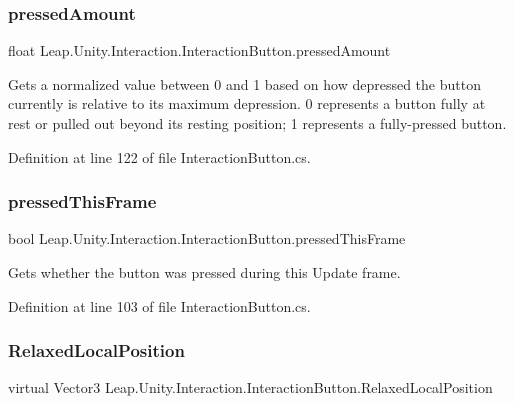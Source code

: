 \subsubsection{\texorpdfstring{pressedAmount}{pressedAmount}}
{\footnotesize\ttfamily float Leap.\+Unity.\+Interaction.\+Interaction\+Button.\+pressed\+Amount\hspace{0.3cm}{\ttfamily [get]}}



Gets a normalized value between 0 and 1 based on how depressed the button currently is relative to its maximum depression. 0 represents a button fully at rest or pulled out beyond its resting position; 1 represents a fully-\/pressed button. 



Definition at line 122 of file Interaction\+Button.\+cs.

\mbox{\label{class_leap_1_1_unity_1_1_interaction_1_1_interaction_button_ad9f5e7c4373f864d20166bbc438f957a}} 
\subsubsection{\texorpdfstring{pressedThisFrame}{pressedThisFrame}}
{\footnotesize\ttfamily bool Leap.\+Unity.\+Interaction.\+Interaction\+Button.\+pressed\+This\+Frame\hspace{0.3cm}{\ttfamily [get]}}



Gets whether the button was pressed during this Update frame. 



Definition at line 103 of file Interaction\+Button.\+cs.

\mbox{\label{class_leap_1_1_unity_1_1_interaction_1_1_interaction_button_a31ea002ad202e24eeedc6291f3e6fd8e}} 
\subsubsection{\texorpdfstring{RelaxedLocalPosition}{RelaxedLocalPosition}}
{\footnotesize\ttfamily virtual Vector3 Leap.\+Unity.\+Interaction.\+Interaction\+Button.\+Relaxed\+Local\+Position\hspace{0.3cm}{\ttfamily [get]}}



